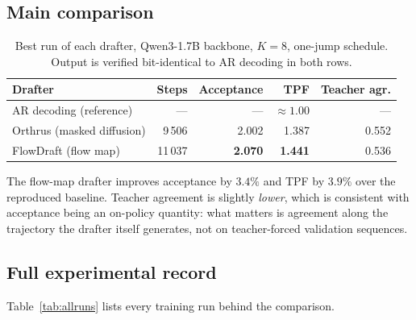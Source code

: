 \documentclass{zapiski}
\begin{document}
\subsection{Main comparison}

\begin{table}[!tbh]
\centering
\begin{tabular}{lrrrr}
\toprule
Drafter & Steps & Acceptance & TPF & Teacher agr. \\
\midrule
AR decoding (reference)      & ---    & ---   & $\approx 1.00$ & --- \\
Orthrus (masked diffusion)   & 9\,506 & 2.002 & 1.387 & 0.552 \\
FlowDraft (flow map)         & 11\,037& \textbf{2.070} & \textbf{1.441} & 0.536 \\
\bottomrule
\end{tabular}
\caption{Best run of each drafter, Qwen3-1.7B backbone, $K=8$, one-jump
schedule. Output is verified bit-identical to AR decoding in both rows.}
\label{tab:main}
\end{table}

The flow-map drafter improves acceptance by $3.4\%$ and TPF by $3.9\%$ over the
reproduced baseline. Teacher agreement is slightly \emph{lower}, which is
consistent with acceptance being an on-policy quantity: what matters is
agreement along the trajectory the drafter itself generates, not on
teacher-forced validation sequences.

\subsection{Full experimental record}

Table~\ref{tab:allruns} lists every training run behind the comparison.
\end{document}
